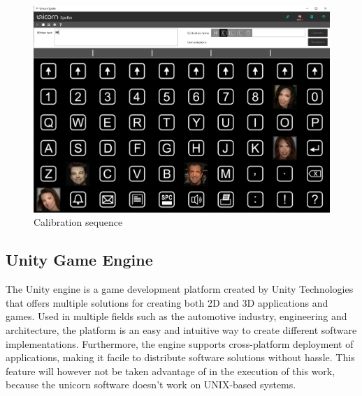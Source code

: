 \begin{figure}[H]
  \centering
  \includegraphics[width=1\textwidth]{Graphics/Speller Calibration.png}
  \caption{Calibration sequence}
\end{figure}
\vspace{\baselineskip}


\subsection{Unity Game Engine}
The Unity engine is a game development platform created by Unity Technologies that offers multiple solutions for creating both 2D and 3D applications and games. Used in multiple fields such as the automotive industry, engineering and architecture\cite{Unity_engine}, the platform is an easy and intuitive way to create different software implementations. Furthermore, the engine supports cross-platform deployment of applications, making it facile to distribute software solutions without hassle. This feature will however not be taken advantage of in the execution of this work, because the unicorn software doesn't work on UNIX-based systems\cite{UnicornSuite_Manual}.
\vspace{\baselineskip}


